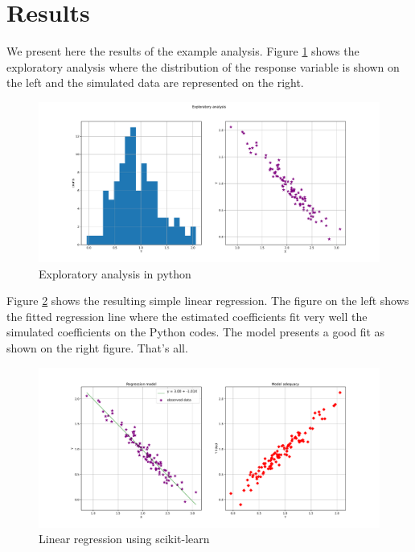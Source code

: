 \section{Results}


We present here the results of the example analysis. Figure \ref{fig:exploratory_analysis} shows the exploratory analysis where the distribution of the response variable is shown on the left and the simulated data are represented on the right.

\begin{figure}
\centering
\includegraphics[width=\textwidth]{figures/fig_exploratory_analysis.pdf}
\caption{Exploratory analysis in python}
\label{fig:exploratory_analysis}
\end{figure}

Figure \ref{fig:linear_regression} shows the resulting simple linear regression. The figure on the left shows the fitted regression line where the estimated coefficients fit very well the simulated coefficients on the Python codes. The model presents a good fit as shown on the right figure. That's all.

\begin{figure}
\centering
\includegraphics[width=\textwidth]{figures/fig_linear_regression.pdf}
\caption{Linear regression using scikit-learn}
\label{fig:linear_regression}
\end{figure}